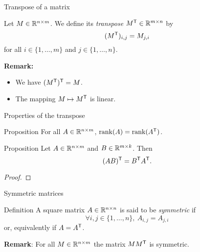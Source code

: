 \documentclass{beamer}
\begin{document}
\begin{frame}[t]{Transpose of a matrix}
	\grid

	\vspace{-0.4cm}
	\begin{definition}
		Let $M \in \mathbb{R}^{n \times m}$. We define its \emph{transpose} $M^{{\sf T}} \in \mathbb{R}^{m \times n}$ by
		$$
		(M^{{\sf T}})_{i,j} = M_{j,i}
		$$
		for all $i \in \{1, \dots, m\}$ and $j \in \{1, \dots, n\}$.
	\end{definition}

	\vspace{3cm}
	\textbf{Remark:}
	\begin{itemize}
		\item We have $(M^{{\sf T}})^{{\sf T}} = M$. 
		\item The mapping $M \mapsto M^{{\sf T}}$ is linear.
	\end{itemize}
\end{frame}


\begin{frame}[t]{Properties of the transpose}
	\grid

	\vspace{-0.4cm}
	\begin{block}{Proposition}
		For all $A \in \mathbb{R}^{n \times m}$, \quad
		${{\rm rank}}(A) = {{\rm rank}}(A^{{\sf T}})$.
	\end{block}

	\begin{block}{Proposition}
		Let $A \in \mathbb{R}^{n \times m}$ and $B \in \mathbb{R}^{m \times k}$. Then
		\vspace{-0.3cm}
		$$
		(AB)^{\sT} = B^{\sT} A^{\sT}.
		\vspace{-0.3cm}
		$$
	\end{block}
	\begin{proof}
		\vspace{2.5cm}
		\vfill
	\end{proof}
\end{frame}

\begin{frame}[t]{Symmetric matrices}
	\grid

	\vspace{-0.4cm}
	\begin{block}{Definition}
	A square matrix $A \in \mathbb{R}^{n \times n}$ is said to be \emph{symmetric} if
	$$
	\forall i,j \in \{1, \dots, n\}, \ A_{i,j} = A_{j,i}
	$$
	or, equivalently if $A = A^{{\sf T}}$.
	\end{block}

	\textbf{Remark}: For all $M \in \mathbb{R}^{n \times m}$ the matrix $M M^{{\sf T}}$ is symmetric.
\end{frame}
\end{document}
